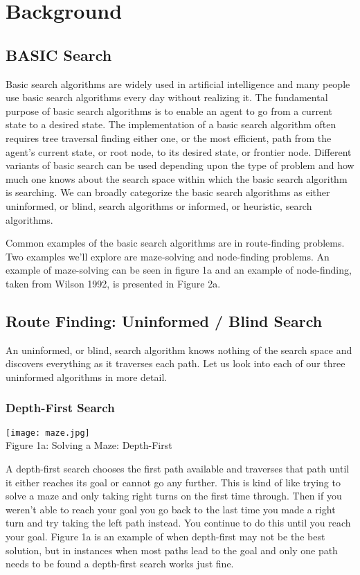 \documentclass[11pt]{article}
\begin{document}
\section{Background}
\subsection{BASIC Search}
Basic search algorithms are widely used in artificial intelligence and many 
people use basic search algorithms every day without realizing it.  The 
fundamental purpose of basic search algorithms is to enable an agent to go 
from a current state to a desired state.  The implementation of a basic search 
algorithm often requires tree traversal finding either one, or the most 
efficient, path from the agent's current state, or root node, to its desired 
state, or frontier node.  Different variants of basic search can be used 
depending upon the type of problem and how much one knows about the search 
space within which the basic search algorithm is searching.  We can broadly 
categorize the basic search algorithms as either uninformed, or blind, search 
algorithms or informed, or heuristic, search algorithms.

Common examples of the basic search algorithms are in route-finding problems.  
Two examples we'll explore are maze-solving and node-finding problems.  An
example of maze-solving can be seen in figure 1a and an example of
node-finding, taken from Wilson 1992, is presented in Figure 2a.

\subsection{Route Finding: Uninformed / Blind Search}
An uninformed, or blind, search algorithm knows nothing of the search space and
discovers everything as it traverses each path.  Let us look into each of our
three uninformed algorithms in more detail.

\subsubsection{Depth-First Search}
\begin{center}
\texttt{[image: maze.jpg]}\\
Figure 1a: Solving a Maze: Depth-First
\end{center}

A depth-first search chooses the first path available and traverses that path
until it either reaches its goal or cannot go any further.  This is kind of like
trying to solve a maze and only taking right turns on the first time through. 
Then if you weren't able to reach your goal you go back to the last time you
made a right turn and try taking the left path instead.  You continue to do this
until you reach your goal.  Figure 1a is an example of when depth-first may not
be the best solution, but in instances when most paths lead to the goal and only
one path needs to be found a depth-first search works just fine.
\end{document}
